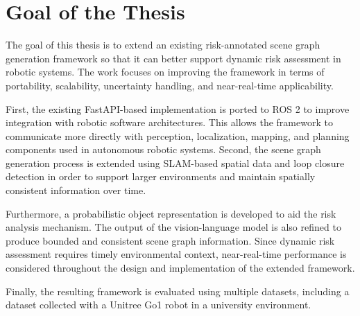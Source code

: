 \section{Goal of the Thesis}
\small{
The goal of this thesis is to extend an existing risk-annotated scene graph generation framework so that it can better support dynamic risk assessment in robotic systems. The work focuses on improving the framework in terms of portability, scalability, uncertainty handling, and near-real-time applicability.

First, the existing FastAPI-based implementation is ported to ROS 2 to improve integration with robotic software architectures. This allows the framework to communicate more directly with perception, localization, mapping, and planning components used in autonomous robotic systems. Second, the scene graph generation process is extended using SLAM-based spatial data and loop closure detection in order to support larger environments and maintain spatially consistent information over time.

Furthermore, a probabilistic object representation is developed to aid the risk analysis mechanism. The output of the vision-language model is also refined to produce bounded and consistent scene graph information. Since dynamic risk assessment requires timely environmental context, near-real-time performance is considered throughout the design and implementation of the extended framework.

Finally, the resulting framework is evaluated using multiple datasets, including a dataset collected with a Unitree Go1 robot in a university environment.

}

